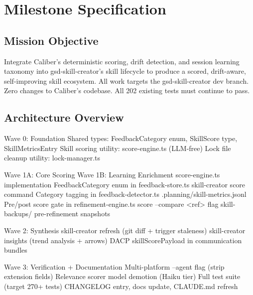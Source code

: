 \documentclass[11pt,letterpaper]{article}
\newcommand{\stageheader}[2]{%
  \noindent\colorbox{#2}{\makebox[\textwidth][l]{%
    \textcolor{white}{\bfseries\sffamily\hspace{6pt}#1\hspace{6pt}}}}%
  \vspace{0.5em}\par%
}
\begin{document}
\newpage

\stageheader{STAGE 3 --- MISSION PACKAGE}{tertiary}

\section{Milestone Specification}

\subsection{Mission Objective}

Integrate Caliber's deterministic scoring, drift detection, and session learning taxonomy into gsd-skill-creator's skill lifecycle to produce a scored, drift-aware, self-improving skill ecosystem. All work targets the gsd-skill-creator dev branch. Zero changes to Caliber's codebase. All 202 existing tests must continue to pass.

\subsection{Architecture Overview}

\begin{asciibox}
  Wave 0: Foundation
    Shared types: FeedbackCategory enum, SkillScore type, SkillMetricsEntry
    Skill scoring utility: score-engine.ts (LLM-free)
    Lock file cleanup utility: lock-manager.ts

  Wave 1A: Core Scoring                  Wave 1B: Learning Enrichment
    score-engine.ts implementation          FeedbackCategory enum in feedback-store.ts
    skill-creator score command             Category tagging in feedback-detector.ts
    .planning/skill-metrics.jsonl           Pre/post score gate in refinement-engine.ts
    score --compare <ref> flag              skill-backups/ pre-refinement snapshots

  Wave 2: Synthesis
    skill-creator refresh (git diff + trigger staleness)
    skill-creator insights (trend analysis + arrows)
    DACP skillScorePayload in communication bundles

  Wave 3: Verification + Documentation
    Multi-platform --agent flag (strip extension fields)
    Relevance scorer model demotion (Haiku tier)
    Full test suite (target 270+ tests)
    CHANGELOG entry, docs update, CLAUDE.md refresh
\end{asciibox}
\end{document}
